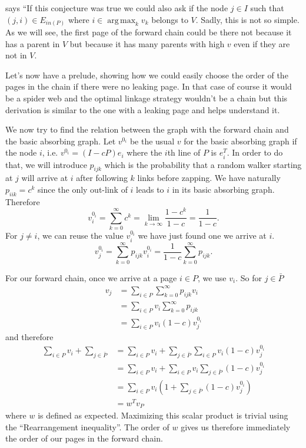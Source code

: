 \documentclass{article}
\DeclareMathOperator*{\argmax}{arg\,max}
\newcommand{\1}{\mathbf{1}}
\theoremstyle{definition}
\begin{document}
\cite{de2008maximizing} says
``If this conjecture was true we could also ask if the node $j \in I$ such that
$(j, i) \in E_{in(P)}$ where $i \in \argmax_k v_k$ belongs to $V$.
Sadly, this is not so simple. 
As we will see, the first page of the forward chain could be there not
because it has a parent in $V$ but because it has many parents with high $v$ even if they are not in $V$.

Let's now have a prelude, showing how we could easily choose the order of the pages in the chain if there were
no leaking page.
In that case of course it would be a spider web and the optimal linkage strategy wouldn't be a chain but this derivation is similar
to the one with a leaking page and helps understand it.

We now try to find the relation between the graph with the forward chain and the basic absorbing graph.
Let $v^{0_i}$ be the usual $v$ for the basic absorbing graph if the node $i$,
i.e. $v^{0_i} = (I - cP)e_i$ where the $i$th line of $P$ is $e_i^T$.
In order to do that, we will introduce $p_{ijk}$ which is the probability that a random walker starting at $j$
will arrive at $i$ after following $k$ links before zapping.
We have naturally $p_{iik} = c^k$ since the only out-link of $i$ leads to $i$ in its basic absorbing graph.
Therefore
\[ v_i^{0_i} = \sum_{k=0}^\infty c^k = \lim_{k \to \infty} \frac{1-c^k}{1-c} = \frac{1}{1-c}. \]
For $j \neq i$, we can reuse the value $v_i^{0_i}$ we have just found one we arrive at $i$.
\[ v_j^{0_i} = \sum_{k=0}^\infty p_{ijk} v_i^{0_i} = \frac{1}{1-c} \sum_{k=0}^\infty p_{ijk}. \]

For our forward chain,
once we arrive at a page $i \in P$, we use $v_i$.
So for $j \in \bar{P}$
\begin{align*}
  v_j & = \sum_{i \in P} \sum_{k = 0}^\infty p_{ijk} v_i\\
      & = \sum_{i \in P} v_i \sum_{k = 0}^\infty p_{ijk}\\
      & = \sum_{i \in P} v_i (1-c) v_j^{0_i}
\end{align*}
and therefore
\begin{align*}
  \sum_{i \in P} v_i + \sum_{j \in \bar{P}}
  & = \sum_{i \in P} v_i + \sum_{j \in \bar{P}} \sum_{i \in P} v_i (1-c) v_j^{0_i}\\
  & = \sum_{i \in P} v_i + \sum_{i \in P} v_i \sum_{j \in \bar{P}} (1-c) v_j^{0_i}\\
  & = \sum_{i \in P} v_i \left(1 + \sum_{j \in \bar{P}} (1-c) v_j^{0_i}\right)\\
  & = w^T v_P
\end{align*}
where $w$ is defined as expected.
Maximizing this scalar product is trivial using the ``Rearrangement inequality''.
The order of $w$ gives us therefore immediately the order of our pages in the forward chain.




\end{document}
